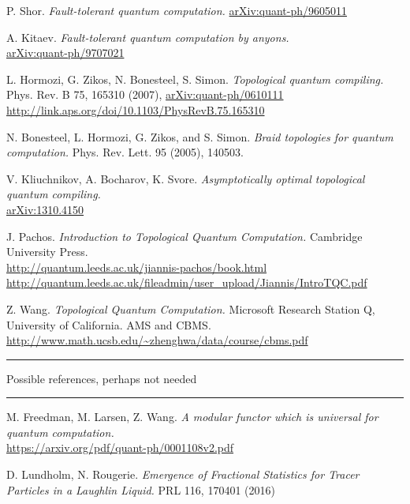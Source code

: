 \documentclass[a4paper,10pt,oneside]{book}
\theoremstyle{plain}
\theoremstyle{definition}
\theoremstyle{remark}
\begin{document}
\begin{thebibliography}{99}
    P. Shor.
    \textit{Fault-tolerant quantum computation.}
    \href{https://arxiv.org/abs/quant-ph/9605011}{arXiv:quant-ph/9605011}

    A. Kitaev.
    \textit{Fault-tolerant quantum computation by anyons.}
    \\
    \href{https://arxiv.org/abs/quant-ph/9707021}{arXiv:quant-ph/9707021}

    L. Hormozi, G. Zikos, N. Bonesteel, S. Simon.
    \textit{Topological quantum compiling.}
    Phys. Rev. B 75, 165310 (2007), \href{https://arxiv.org/abs/quant-ph/0610111}{arXiv:quant-ph/0610111}
    \\
    \url{http://link.aps.org/doi/10.1103/PhysRevB.75.165310}

  \bibitem{}
    N. Bonesteel, L. Hormozi, G. Zikos, and S. Simon.
    \textit{Braid topologies for quantum computation.}
    Phys. Rev. Lett. 95 (2005), 140503.

    V. Kliuchnikov, A. Bocharov, K. Svore.
    \textit{Asymptotically optimal topological quantum compiling.}
    \\
    \href{https://arxiv.org/abs/1310.4150}{arXiv:1310.4150}

    J. Pachos.
    \textit{Introduction to Topological Quantum Computation.}
    Cambridge University Press.
    \\
    \url{http://quantum.leeds.ac.uk/jiannis-pachos/book.html}
    \\
    \url{http://quantum.leeds.ac.uk/fileadmin/user_upload/Jiannis/IntroTQC.pdf}

    Z. Wang.
    \textit{Topological Quantum Computation.}
    Microsoft Research Station Q, University of California.
    AMS and CBMS.
    \url{http://www.math.ucsb.edu/~zhenghwa/data/course/cbms.pdf}

  \vspace{1cm}
  \hrule
  Possible references, perhaps not needed
  \hrule

  \bibitem{}
    M. Freedman, M. Larsen, Z. Wang.
    \textit{A modular functor which is universal for quantum computation.}
    \\
    \url{https://arxiv.org/pdf/quant-ph/0001108v2.pdf}

    D. Lundholm, N. Rougerie.
    \textit{Emergence of Fractional Statistics for Tracer Particles in a Laughlin Liquid.}
    PRL 116, 170401 (2016)


\end{thebibliography}
\end{document}
